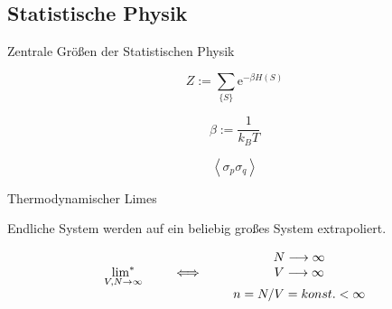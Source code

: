 \documentclass[11pt]{beamer}
\newcommand{\corr}[1]{\left\langle #1 \right\rangle}
\newcommand{\tlim}{ \underset{V,N \to \infty}{\text{lim}^{*}}}
\begin{document}
\subsection{Statistische Physik}
    \begin{frame}{Zentrale Größen der Statistischen Physik}
    
        \begin{grayframe}[frametitle = {Zustandssumme}]
        \begin{equation} \nonumber
            Z := \sum_{\{S\}} \mathrm{e}^{- \beta H( S ) } 
        \end{equation}
        \end{grayframe}
        
        \vspace{0.5cm}
        \begin{equation} \nonumber
            \beta := \frac{1}{k_B T}
        \end{equation}
        
        \begin{grayframe}[frametitle = {Spin-Spin-Korrelation}]
        \begin{equation} \nonumber
             \corr{\sigma_{p} \sigma_{q}}
        \end{equation}   
        \end{grayframe}


    \end{frame}
    
    \begin{frame}{Thermodynamischer Limes} 
        
        Endliche System werden auf ein beliebig großes System extrapoliert.
        \vspace{0.5cm}
    
        \begin{grayframe}
            \begin{equation} \nonumber
                \centering
                \begin{tabular}{lccccc}
                            &  &                 &    &      $N \longrightarrow \infty$\\
                    $\tlim$ &  &  $\iff$           &   &      $V \longrightarrow \infty$ \\
                            &  &                 &   & $n =  N/V = konst. < \infty$
                \end{tabular}
                \end{equation}
        \end{grayframe}
    \end{frame}
    
\end{document}
